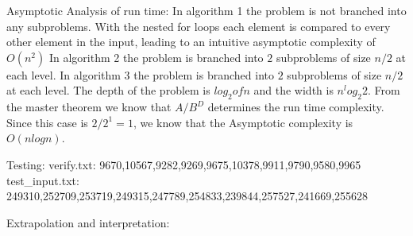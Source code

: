 Asymptotic Analysis of run time:
	In algorithm 1 the problem is not branched into any subproblems.  With the nested for loops each element is compared to every other element in the input, leading to an intuitive asymptotic complexity of $O(n^2)$
	In algorithm 2 the problem is branched into $2$ subproblems of size $n/2$ at each level.  
	In algorithm 3 the problem is branched into $2$ subproblems of size $n/2$ at each level.  The depth of the problem is $log_2 of n$ and the width is $n^log_2 2$.  From the master theorem we know that $A/B^D$ determines the run time complexity.  Since this case is $2/2^1 = 1$, we know that the Asymptotic complexity is $O(n log n)$.

	Testing: verify.txt:		9670,10567,9282,9269,9675,10378,9911,9790,9580,9965
			 test_input.txt:	249310,252709,253719,249315,247789,254833,239844,257527,241669,255628


	Extrapolation and interpretation:
